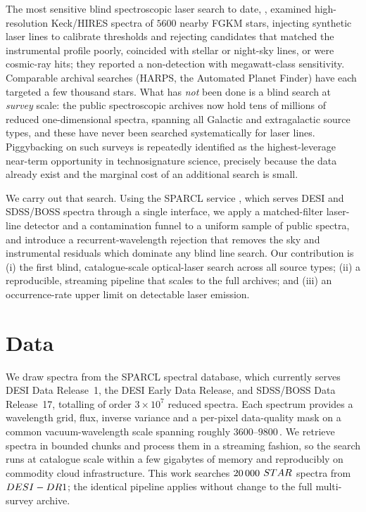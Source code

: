 \documentclass[11pt]{article}
\newcommand{\Ang}{\text{\AA}\xspace}
\begin{document}
The most sensitive blind spectroscopic laser search to date, \citet{Tellis2017},
examined high-resolution Keck/HIRES spectra of $5600$ nearby FGKM stars, injecting
synthetic laser lines to calibrate thresholds and rejecting candidates that
matched the instrumental profile poorly, coincided with stellar or night-sky
lines, or were cosmic-ray hits; they reported a non-detection with megawatt-class
sensitivity. Comparable archival searches (HARPS, the Automated Planet Finder)
have each targeted a few thousand stars. What has \emph{not} been done is a blind
search at \emph{survey} scale: the public spectroscopic archives now hold tens of
millions of reduced one-dimensional spectra, spanning all Galactic and
extragalactic source types, and these have never been searched systematically for
laser lines. Piggybacking on such surveys is repeatedly identified as the
highest-leverage near-term opportunity in technosignature science, precisely
because the data already exist and the marginal cost of an additional search is
small.

We carry out that search. Using the SPARCL service \citep{SPARCL2024}, which serves
DESI \citep{DESI2024} and SDSS/BOSS spectra through a single interface, we apply a
matched-filter laser-line detector and a contamination funnel to a uniform sample
of public spectra, and introduce a recurrent-wavelength rejection that removes the
sky and instrumental residuals which dominate any blind line search. Our
contribution is (i) the first blind, catalogue-scale optical-laser search across
all source types; (ii) a reproducible, streaming pipeline that scales to the full
archives; and (iii) an occurrence-rate upper limit on detectable laser emission.

\section{Data}
\label{sec:data}
We draw spectra from the SPARCL spectral database, which currently serves DESI
Data Release~1, the DESI Early Data Release, and SDSS/BOSS Data Release~17,
totalling of order $3\times10^{7}$ reduced spectra. Each spectrum provides a
wavelength grid, flux, inverse variance and a per-pixel data-quality mask on a
common vacuum-wavelength scale spanning roughly $3600$--$9800$\,\Ang. We retrieve
spectra in bounded chunks and process them in a streaming fashion, so the search
runs at catalogue scale within a few gigabytes of memory and reproducibly on
commodity cloud infrastructure. This work searches $20\,000$
$STAR$ spectra from $DESI-DR1$; the identical pipeline applies
without change to the full multi-survey archive.
\end{document}
